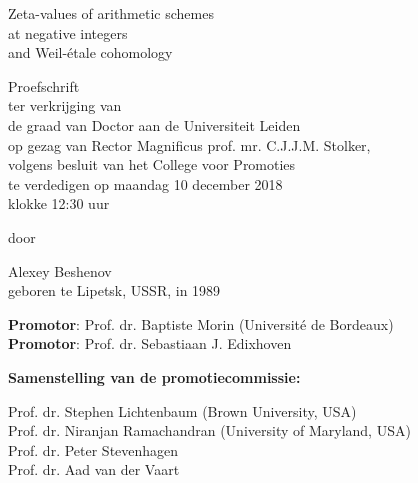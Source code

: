 \thispagestyle{empty}
\begin{center}
  \normalfont\sffamily\bfseries

  {\LARGE Zeta-values of arithmetic schemes\\
    at negative integers\\
    and Weil-étale cohomology

  }

  \vspace{\fill}

  Proefschrift\\
  ter verkrijging van\\
  de graad van Doctor aan de Universiteit Leiden\\
  op gezag van Rector Magnificus prof. mr. C.J.J.M. Stolker,\\
  volgens besluit van het College voor Promoties\\
  te verdedigen op maandag 10 december 2018\\
  klokke 12:30 uur

  \vspace{\fill}

  door

  \vspace{\fill}

  Alexey Beshenov\\
  geboren te Lipetsk, USSR, in 1989
\end{center}

\newpage

\thispagestyle{empty}

\noindent \textbf{Promotor}: Prof. dr. Baptiste Morin (Université de Bordeaux) \\
\noindent \textbf{Promotor}: Prof. dr. Sebastiaan J. Edixhoven

\vspace{2em}

\noindent\textbf{Samenstelling van de promotiecommissie:}

\noindent Prof. dr. Stephen Lichtenbaum (Brown University, USA) \\
Prof. dr. Niranjan Ramachandran (University of Maryland, USA) \\
Prof. dr. Peter Stevenhagen \\
Prof. dr. Aad van der Vaart

\vspace{\fill}

